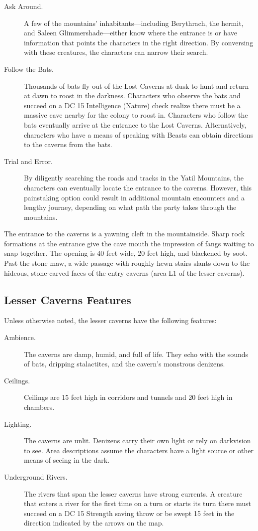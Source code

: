\documentclass[10pt,a4paper,twoside,bg=print,twocolumn,openany,nodeprecatedcode]{dndbook}
\begin{document}
\begin{description}
\item[Ask Around.]
A few of the mountains' inhabitants—including Berythrach, the hermit, and Saleen Glimmershade—either know where the entrance is or have information that points the characters in the right direction. By conversing with these creatures, the characters can narrow their search.
\item[Follow the Bats.]
Thousands of bats fly out of the Lost Caverns at dusk to hunt and return at dawn to roost in the darkness. Characters who observe the bats and succeed on a DC 15 Intelligence (Nature) check realize there must be a massive cave nearby for the colony to roost in. Characters who follow the bats eventually arrive at the entrance to the Lost Caverns. Alternatively, characters who have a means of speaking with Beasts can obtain directions to the caverns from the bats.
\item[Trial and Error.]
By diligently searching the roads and tracks in the Yatil Mountains, the characters can eventually locate the entrance to the caverns. However, this painstaking option could result in additional mountain encounters and a lengthy journey, depending on what path the party takes through the mountains.
\end{description}

The entrance to the caverns is a yawning cleft in the mountainside. Sharp rock formations at the entrance give the cave mouth the impression of fangs waiting to snap together. The opening is 40 feet wide, 20 feet high, and blackened by soot. Past the stone maw, a wide passage with roughly hewn stairs slants down to the hideous, stone-carved faces of the entry caverns (area L1 of the lesser caverns).

\subsection{Lesser Caverns Features}
Unless otherwise noted, the lesser caverns have the following features:


\begin{description}
\item[Ambience.]
The caverns are damp, humid, and full of life. They echo with the sounds of bats, dripping stalactites, and the cavern's monstrous denizens.
\item[Ceilings.]
Ceilings are 15 feet high in corridors and tunnels and 20 feet high in chambers.
\item[Lighting.]
The caverns are unlit. Denizens carry their own light or rely on darkvision to see. Area descriptions assume the characters have a light source or other means of seeing in the dark.
\item[Underground Rivers.]
The rivers that span the lesser caverns have strong currents. A creature that enters a river for the first time on a turn or starts its turn there must succeed on a DC 15 Strength saving throw or be swept 15 feet in the direction indicated by the arrows on the map.
\end{description}
\end{document}
